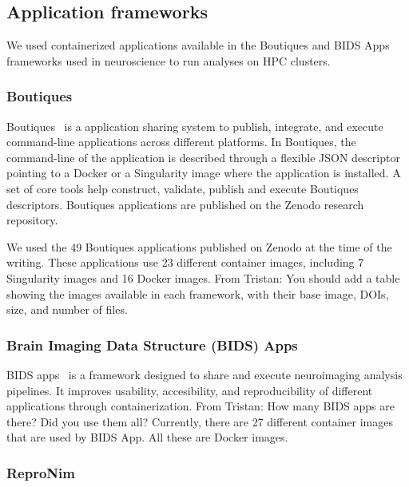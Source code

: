 \documentclass[a4paper,num-refs]{oup-contemporary}
\newcommand{\TG}[1]{\color{blue}From Tristan: #1 \color{black}}
\begin{document}
\subsection{Application frameworks}

We used containerized applications available in the Boutiques and BIDS Apps
frameworks used in neuroscience to run analyses on HPC clusters. 

\subsubsection{Boutiques}

Boutiques~\cite{glatard2018boutiques} is a application sharing system to
publish, integrate, and execute command-line applications across different
platforms. In Boutiques, the command-line of the application is described
through a flexible JSON descriptor pointing to a Docker or a Singularity
image where the application is installed. A set of core tools help
construct, validate, publish and execute Boutiques descriptors. Boutiques
applications are published on the Zenodo research repository.

We used the 49 Boutiques applications published on Zenodo at the time of
the writing. These applications use 23 different container images,
including 7 Singularity images and 16 Docker images. \TG{You should add a
table showing the images available in each framework, with their base
image, DOIs, size, and number of files.}

\subsubsection{Brain Imaging Data Structure (BIDS) Apps}

BIDS apps~\cite{gorgolewski2017bids} is a framework designed to share and execute neuroimaging
analysis pipelines. It improves usability, accesibility, and reproducibility
of different applications through containerization.
\TG{How many BIDS apps are there? Did you use them all?} Currently, there are 27 different container images that are used by
BIDS App. All these are Docker images.

\subsubsection{ReproNim}
\end{document}

